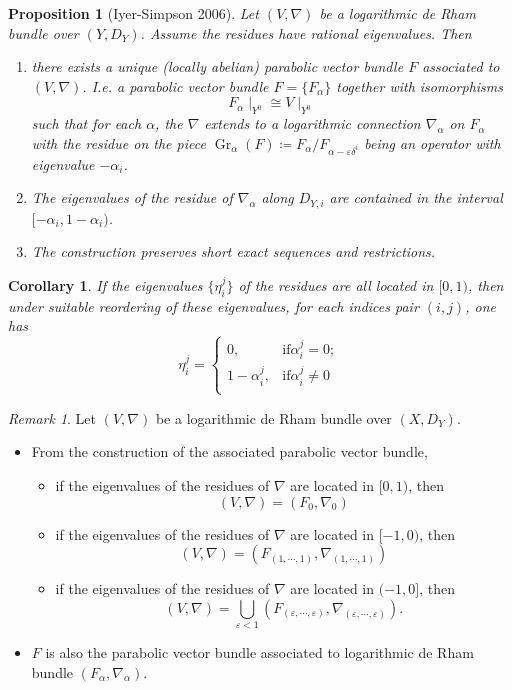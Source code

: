 \documentclass[12pt,twoside]{book}
\theoremstyle{plain}
\newtheorem{proposition}[proposition]{Proposition}
\newtheorem{corollary}[corollary]{Corollary}
\theoremstyle{definition}
\theoremstyle{remark}
\newtheorem{remark}[remark]{Remark}
\DeclareMathOperator\Gr{Gr}
\numberwithin{equation}{section}
\begin{document}
\begin{proposition}[Iyer-Simpson 2006] \label{IvSi06}
Let $(V,\nabla)$ be a logarithmic de Rham bundle over $(Y,D_Y)$. Assume the residues have rational eigenvalues. Then
\begin{enumerate}
\item[$1).$] 
there exists a unique (locally abelian) parabolic vector bundle $F$ associated to $(V,\nabla)$. I.e. a parabolic vector bundle $F=\{F_\alpha\}$ together with isomorphisms
\[F_\alpha\mid_{Y^0} \cong V\mid_{Y^0}\]
such that for each $\alpha$, the $\nabla$ extends to a logarithmic connection $\nabla_\alpha$ on $F_\alpha$ with the residue on the piece $\Gr_\alpha(F)\coloneqq F_\alpha/F_{\alpha-\varepsilon\delta^i}$ being an operator with eigenvalue $-\alpha_i$.
\item[$2).$]
The eigenvalues of the residue of $\nabla_\alpha$ along $D_{Y,i}$ are contained in the interval $[-\alpha_i,1-\alpha_i)$.
\item[$3).$] 
The construction preserves short exact sequences and restrictions.
\end{enumerate}
\end{proposition}

\begin{corollary} If the eigenvalues $\{\eta_i^j\}$ of the residues are all located in $[0,1)$, then under suitable reordering of these eigenvalues, for each indices pair $(i,j)$, one has
\[\eta_i^j = \left\{\begin{array}{ll}
0,& \text{if} \alpha_i^j=0;\\
1-\alpha_i^j,& \text{if} \alpha_i^j\neq 0\\
\end{array}\right.\]
\end{corollary}

\begin{remark} Let $(V,\nabla)$ be a logarithmic de Rham bundle over $(X,D_Y)$.
\begin{itemize}
\item From the construction of the associated parabolic vector bundle,
\begin{itemize}
\item if the eigenvalues of the residues of $\nabla$ are located in $[0,1)$, then
\[(V,\nabla)=(F_0,\nabla_0)\]
\item if the eigenvalues of the residues of $\nabla$ are located in $[-1,0)$, then
\[(V,\nabla)=(F_{(1,\cdots,1)},\nabla_{(1,\cdots,1)})\]
\item if the eigenvalues of the residues of $\nabla$ are located in $(-1,0]$, then
\[(V,\nabla)=\bigcup_{\varepsilon<1} (F_{(\varepsilon,\cdots,\varepsilon)},\nabla_{(\varepsilon,\cdots,\varepsilon)}).\]
\end{itemize}
\item $F$ is also the parabolic vector bundle associated to logarithmic de Rham bundle $(F_\alpha,\nabla_\alpha)$.
\end{itemize}
\end{remark}
\end{document}
